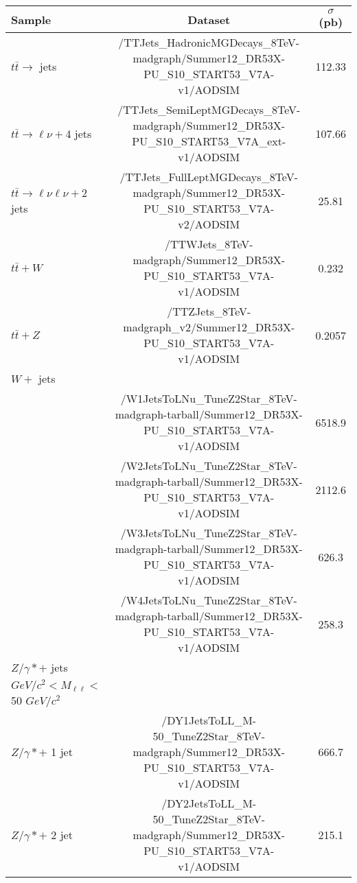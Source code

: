 \documentclass[landscape]{article}
\begin{document}
\begin{small}
\begin{center}
    \begin{tabular}{ | l | c | c | }
      \hline \hline
      Sample & Dataset & $\sigma$ (pb) \\ \hline
      $t\bar{t} \rightarrow$ jets & /TTJets\_HadronicMGDecays\_8TeV-madgraph/Summer12\_DR53X-PU\_S10\_START53\_V7A-v1/AODSIM & 112.33 \\
      $t\bar{t} \rightarrow \ell\nu + $4 jets & /TTJets\_SemiLeptMGDecays\_8TeV-madgraph/Summer12\_DR53X-PU\_S10\_START53\_V7A\_ext-v1/AODSIM & 107.66 \\
      $t\bar{t} \rightarrow \ell\nu\ell\nu + $2 jets & /TTJets\_FullLeptMGDecays\_8TeV-madgraph/Summer12\_DR53X-PU\_S10\_START53\_V7A-v2/AODSIM & 25.81 \\
      \hline
      $t\bar{t} + W$ & /TTWJets\_8TeV-madgraph/Summer12\_DR53X-PU\_S10\_START53\_V7A-v1/AODSIM & 0.232 \\
      \hline
      $t\bar{t} + Z$ & /TTZJets\_8TeV-madgraph\_v2/Summer12\_DR53X-PU\_S10\_START53\_V7A-v1/AODSIM & 0.2057 \\
      \hline
      $W + $ jets & & \\
       & /W1JetsToLNu\_TuneZ2Star\_8TeV-madgraph-tarball/Summer12\_DR53X-PU\_S10\_START53\_V7A-v1/AODSIM & 6518.9 \\
       & /W2JetsToLNu\_TuneZ2Star\_8TeV-madgraph-tarball/Summer12\_DR53X-PU\_S10\_START53\_V7A-v1/AODSIM & 2112.6 \\
       & /W3JetsToLNu\_TuneZ2Star\_8TeV-madgraph-tarball/Summer12\_DR53X-PU\_S10\_START53\_V7A-v1/AODSIM & 626.3 \\
       & /W4JetsToLNu\_TuneZ2Star\_8TeV-madgraph-tarball/Summer12\_DR53X-PU\_S10\_START53\_V7A-v1/AODSIM & 258.3 \\
      \hline
      $Z/\gamma* + $ jets & & \\
      \-10 $GeV/c^{2} < M_{\ell\ell} <$ 50 $GeV/c^{2}$ & & \\
      $Z/\gamma* +$ 1 jet & /DY1JetsToLL\_M-50\_TuneZ2Star\_8TeV-madgraph/Summer12\_DR53X-PU\_S10\_START53\_V7A-v1/AODSIM & 666.7 \\
      $Z/\gamma* +$ 2 jet & /DY2JetsToLL\_M-50\_TuneZ2Star\_8TeV-madgraph/Summer12\_DR53X-PU\_S10\_START53\_V7A-v1/AODSIM & 215.1 \\

\end{tabular}
\end{center}
\end{small}
\end{document}

